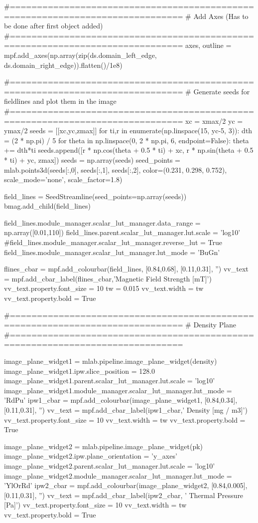 \begin{pycode}[chapter3a]
#==============================================================================
# Add Axes (Has to be done after first object added)
#==============================================================================
axes, outline = mpf.add_axes(np.array(zip(ds.domain_left_edge,
ds.domain_right_edge)).flatten()/1e8)


#==============================================================================
# Generate seeds for fieldlines and plot them in the image
#==============================================================================
xc = xmax/2
yc = ymax/2
seeds = [[xc,yc,zmax]]
for ti,r in enumerate(np.linspace(15, yc-5, 3)):
    dth = (2 * np.pi) / 5
    for theta in np.linspace(0, 2 * np.pi, 6, endpoint=False):
        theta += dth*ti
        seeds.append([r * np.cos(theta + 0.5 * ti) + xc,
                      r * np.sin(theta + 0.5 * ti) + yc, zmax])
seeds = np.array(seeds)
seed_points = mlab.points3d(seeds[:,0], seeds[:,1], seeds[:,2],
color=(0.231, 0.298, 0.752), scale_mode='none',
scale_factor=1.8)


field_lines = SeedStreamline(seed_points=np.array(seeds))
bmag.add_child(field_lines)

field_lines.module_manager.scalar_lut_manager.data_range = np.array([0.01,110])
field_lines.parent.scalar_lut_manager.lut.scale = 'log10'
#field_lines.module_manager.scalar_lut_manager.reverse_lut = True
field_lines.module_manager.scalar_lut_manager.lut_mode = 'BuGn'

flines_cbar = mpf.add_colourbar(field_lines, [0.84,0.68], [0.11,0.31], '')
vv_text = mpf.add_cbar_label(flines_cbar,'Magnetic Field Strength [mT]')
vv_text.property.font_size = 10
tw = 0.015
vv_text.width = tw
vv_text.property.bold = True

#==============================================================================
# Density Plane
#==============================================================================

image_plane_widget1 = mlab.pipeline.image_plane_widget(density)
image_plane_widget1.ipw.slice_position = 128.0
image_plane_widget1.parent.scalar_lut_manager.lut.scale = 'log10'
image_plane_widget1.module_manager.scalar_lut_manager.lut_mode = 'RdPu'
ipw1_cbar = mpf.add_colourbar(image_plane_widget1, [0.84,0.34], [0.11,0.31], '')
vv_text = mpf.add_cbar_label(ipw1_cbar,'     Density [mg / m3]')
vv_text.property.font_size = 10
vv_text.width = tw
vv_text.property.bold = True

image_plane_widget2 = mlab.pipeline.image_plane_widget(pk)
image_plane_widget2.ipw.plane_orientation = 'y_axes'
image_plane_widget2.parent.scalar_lut_manager.lut.scale = 'log10'
image_plane_widget2.module_manager.scalar_lut_manager.lut_mode = 'YlOrRd'
ipw2_cbar = mpf.add_colourbar(image_plane_widget2, [0.84,0.005], [0.11,0.31], '')
vv_text = mpf.add_cbar_label(ipw2_cbar, '   Thermal Pressure [Pa]')
vv_text.property.font_size = 10
vv_text.width = tw
vv_text.property.bold = True


\end{pycode}
